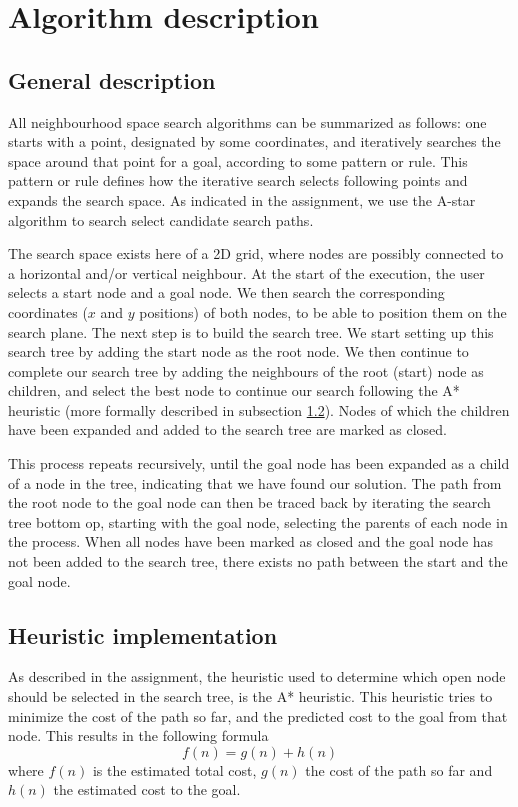 \documentclass[12pt, a4paper]{article}
\begin{document}



\pagestyle{fancy}

\section{Algorithm description}
\subsection{General description}
All neighbourhood space search algorithms can be summarized as follows: one starts with a point, designated by some coordinates, and iteratively searches the space around that point for a goal, according to some pattern or rule. This pattern or rule defines how the iterative search selects following points and expands the search space. As indicated in the assignment, we use the A-star algorithm to search select candidate search paths.

The search space exists here of a 2D grid, where nodes are possibly connected to a horizontal and/or vertical neighbour. At the start of the execution, the user selects a start node and a goal node. We then search the corresponding coordinates ($x$ and $y$ positions) of both nodes, to be able to position them on the search plane. The next step is to build the search tree. We start setting up this search tree by adding the start node as the root node. We then continue to complete our search tree by adding the neighbours of the root (start) node as children, and select the best node to continue our search following the A* heuristic (more formally described in subsection \ref{subsection-heuristic-choice}). Nodes of which the children have been expanded and added to the search tree are marked as closed.

This process repeats recursively, until the goal node has been expanded as a child of a node in the tree, indicating that we have found our solution. The path from the root node to the goal node can then be traced back by iterating the search tree bottom op, starting with the goal node, selecting the parents of each node in the process.
When all nodes have been marked as closed and the goal node has not been added to the search tree, there exists no path between the start and the goal node.

\subsection{Heuristic implementation}
\label{subsection-heuristic-choice}
As described in the assignment, the heuristic used to determine which open node should be selected in the search tree, is the A* heuristic. This heuristic tries to minimize the cost of the path so far, and the predicted cost to the goal from that node. This results in the following formula
\begin{equation}\label{eq:fn}
f(n) = g(n) + h(n)
\end{equation}
where $f(n)$ is the estimated total cost, $g(n)$ the cost of the path so far and $h(n)$ the estimated cost to the goal.
\end{document}
